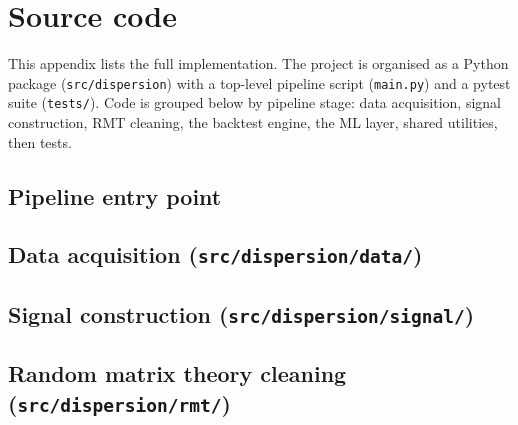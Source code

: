 
\appendix
\section{Source code}

This appendix lists the full implementation. The project is organised as a
Python package (\texttt{src/dispersion}) with a top-level pipeline script
(\texttt{main.py}) and a pytest suite (\texttt{tests/}). Code is grouped
below by pipeline stage: data acquisition, signal construction, RMT
cleaning, the backtest engine, the ML layer, shared utilities, then tests.

\subsection{Pipeline entry point}


\subsection{Data acquisition (\texttt{src/dispersion/data/})}







\subsection{Signal construction (\texttt{src/dispersion/signal/})}


\subsection{Random matrix theory cleaning (\texttt{src/dispersion/rmt/})}



